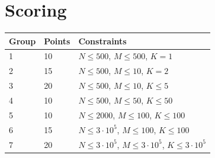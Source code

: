 \section*{Scoring}
\begin{tabular}{|l|l|l|}
    \hline
    Group & Points & Constraints \\ \hline
    1     &  10  & $N \leq 500$,          $M \leq 500$, $K = 1$ \\ \hline
    2     &  15  & $N \leq 500$,          $M \leq 10$, $K = 2$ \\ \hline
    3     &  20  & $N \leq 500$,          $M \leq 10$, $K \leq 5$ \\ \hline
    4     &  10  & $N \leq 500$,          $M \leq 50$, $K \leq 50$ \\ \hline
    5     &  10  & $N \leq 2000$,         $M \leq 100$, $K \leq 100$ \\ \hline
    6     &  15  & $N \leq 3 \cdot 10^5$, $M \leq 100$, $K \leq 100$ \\ \hline
    7     &  20  & $N \leq 3 \cdot 10^5$, $M \leq 3 \cdot 10^5$, $K \leq 3 \cdot 10^5$ \\ \hline
\end{tabular}


